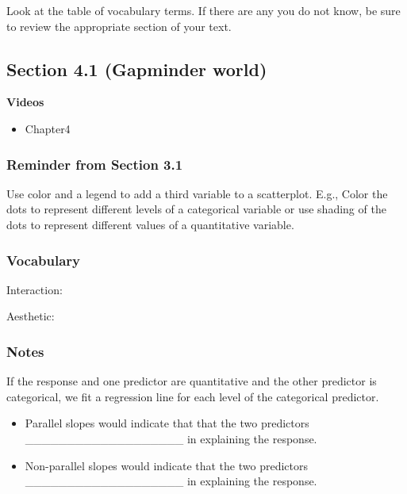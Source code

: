 \documentclass[
]{report}
\providecommand{\tightlist}{%
  \setlength{\itemsep}{0pt}\setlength{\parskip}{0pt}}
\newcommand{\rgs}{\vspace{12pt}} %
\begin{document}
Look at the table of vocabulary terms. If there are any you do not know, be sure to review the appropriate section of your text.

\hypertarget{section-4.1-gapminder-world}{%
\subsection*{Section 4.1 (Gapminder world)}\label{section-4.1-gapminder-world}}


\textbf{Videos}

\begin{itemize}
\tightlist
\item
  Chapter4
\end{itemize}


\hypertarget{reminder-from-section-3.1}{%
\subsubsection*{Reminder from Section 3.1}\label{reminder-from-section-3.1}}

Use color and a legend to add a third variable to a scatterplot. E.g., Color the dots to represent different levels of a categorical variable or use shading of the dots to represent different values of a quantitative variable.

\hypertarget{vocabulary-9}{%
\subsubsection*{Vocabulary}\label{vocabulary-9}}

Interaction:
\rgs

Aesthetic:
\rgs

\hypertarget{notes-12}{%
\subsubsection*{Notes}\label{notes-12}}

If the response and one predictor are quantitative and the other predictor is categorical, we fit a regression line for each level of the categorical predictor.

\begin{itemize}
\item
  Parallel slopes would indicate that that the two predictors \_\_\_\_\_\_\_\_\_\_\_\_\_\_\_\_\_\_\_ in explaining the response.
\item
  Non-parallel slopes would indicate that the two predictors \_\_\_\_\_\_\_\_\_\_\_\_\_\_\_\_\_\_\_ in explaining the response.
\end{itemize}
\end{document}

